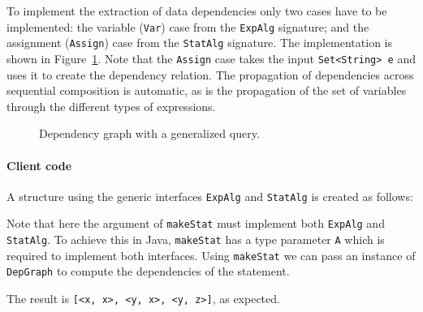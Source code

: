 To implement the extraction of data dependencies only two cases have to
be implemented: the variable (\lstinline{Var}) case from the
\lstinline{ExpAlg} signature; and the assignment (\lstinline{Assign})
case from the \lstinline{StatAlg} signature.  The implementation is
shown in Figure~\ref{deps2}.  Note that the \lstinline{Assign} case takes
the input \lstinline{Set<String> e} and uses it to create the
dependency relation.  The propagation of dependencies across
sequential composition is automatic, as is the propagation of the set
of variables through the different types of expressions.


\begin{figure}[t]
\nocaptionrule
\caption{Dependency graph with a generalized query.}
\label{deps2}
\end{figure}

\paragraph{Client code} A structure using the generic interfaces
\lstinline{ExpAlg} and \lstinline{StatAlg} is created as follows:


\noindent Note that here the argument of
\lstinline{makeStat} must
implement both \lstinline{ExpAlg} and \lstinline{StatAlg}. To achieve
this in Java, {\small\texttt{makeStat}} has a type parameter \lstinline{A}
which is required to implement both interfaces. Using
\lstinline{makeStat} we can pass an instance of
\lstinline{DepGraph} to compute the dependencies of the statement.


\noindent The result is \lstinline{[<x, x>, <y, x>, <y, z>]}, as expected.

